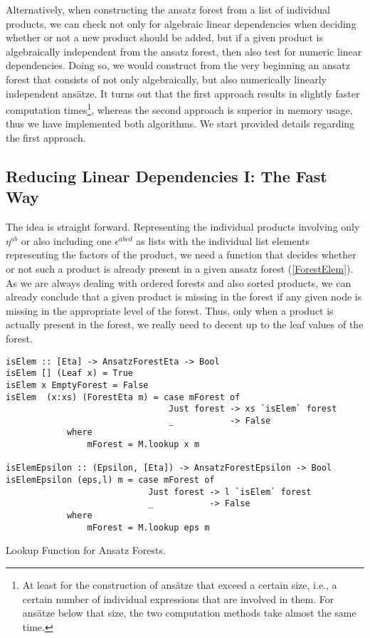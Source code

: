 Alternatively, when constructing the ansatz forest from a list of individual products, we can check not only for algebraic linear dependencies when deciding whether or not a new product should be added, but if a given product is algebraically  independent from the ansatz forest, then also test for numeric linear dependencies. Doing so, we would construct from the very beginning an ansatz forest that consists of not only algebraically, but also numerically linearly independent ansätze.
It turns out that the first approach results in slightly faster computation times\footnote{At least for the construction of ansätze that exceed a certain size, i.e., a certain number of individual expressions that are involved in them.
For ansätze below that size, the two computation methods take almost the same time.}, whereas the second approach is superior in memory usage, thus we have implemented both algorithms. 
We start provided details regarding the first approach. 

\subsection*{Reducing Linear Dependencies I:  The Fast Way}

The idea is straight forward. Representing the individual products involving only $\eta^{ab}$ or also including one $\epsilon^{abcd}$ as lists with the individual list elements representing the factors of the product, we need a function that decides whether or not such a product is already present in a given ansatz forest (\ref{ForestElem}). As we are always dealing with ordered forests and also sorted products, we can already conclude that a given product is missing in the forest if any given node is missing in the appropriate level of the forest. Thus, only when a product is actually present in the forest, we really need to decent up to the leaf values of the forest.
\begin{listing}[hbt!]
\begin{verbatim}
isElem :: [Eta] -> AnsatzForestEta -> Bool
isElem [] (Leaf x) = True
isElem x EmptyForest = False
isElem  (x:xs) (ForestEta m) = case mForest of
                                Just forest -> xs `isElem` forest
                                _           -> False
            where
                mForest = M.lookup x m

isElemEpsilon :: (Epsilon, [Eta]) -> AnsatzForestEpsilon -> Bool
isElemEpsilon (eps,l) m = case mForest of
                            Just forest -> l `isElem` forest
                            _           -> False
            where
                mForest = M.lookup eps m  
\end{verbatim} 
\caption{Lookup Function for Ansatz Forests.}\label{ForestElem}
\end{listing}

